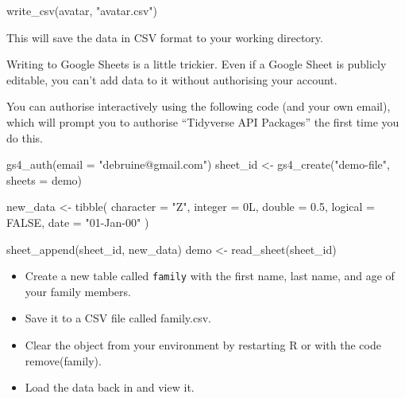 \documentclass[
  oneside]{book}
\newenvironment{Shaded}{\begin{snugshade}}{\end{snugshade}}
\newcommand{\AttributeTok}[1]{\textcolor[rgb]{0.77,0.63,0.00}{#1}}
\newcommand{\ConstantTok}[1]{\textcolor[rgb]{0.00,0.00,0.00}{#1}}
\newcommand{\FloatTok}[1]{\textcolor[rgb]{0.00,0.00,0.81}{#1}}
\newcommand{\FunctionTok}[1]{\textcolor[rgb]{0.00,0.00,0.00}{#1}}
\newcommand{\NormalTok}[1]{#1}
\newcommand{\OtherTok}[1]{\textcolor[rgb]{0.56,0.35,0.01}{#1}}
\newcommand{\StringTok}[1]{\textcolor[rgb]{0.31,0.60,0.02}{#1}}
\providecommand{\tightlist}{%
  \setlength{\itemsep}{0pt}\setlength{\parskip}{0pt}}
\begin{document}
\begin{Shaded}
\begin{Highlighting}[]
\FunctionTok{write\_csv}\NormalTok{(avatar, }\StringTok{"avatar.csv"}\NormalTok{)}
\end{Highlighting}
\end{Shaded}

This will save the data in CSV format to your working directory.

Writing to Google Sheets is a little trickier. Even if a Google Sheet is publicly editable, you can't add data to it without authorising your account.

You can authorise interactively using the following code (and your own email), which will prompt you to authorise ``Tidyverse API Packages'' the first time you do this.

\begin{Shaded}
\begin{Highlighting}[]
\FunctionTok{gs4\_auth}\NormalTok{(}\AttributeTok{email =} \StringTok{"debruine@gmail.com"}\NormalTok{)}
\NormalTok{sheet\_id }\OtherTok{\textless{}{-}} \FunctionTok{gs4\_create}\NormalTok{(}\StringTok{"demo{-}file"}\NormalTok{, }\AttributeTok{sheets =}\NormalTok{ demo)}

\NormalTok{new\_data }\OtherTok{\textless{}{-}} \FunctionTok{tibble}\NormalTok{(}
  \AttributeTok{character =} \StringTok{"Z"}\NormalTok{,}
  \AttributeTok{integer =}\NormalTok{ 0L,}
  \AttributeTok{double =} \FloatTok{0.5}\NormalTok{,}
  \AttributeTok{logical =} \ConstantTok{FALSE}\NormalTok{,}
  \AttributeTok{date =} \StringTok{"01{-}Jan{-}00"}
\NormalTok{)}

\FunctionTok{sheet\_append}\NormalTok{(sheet\_id, new\_data)}
\NormalTok{demo }\OtherTok{\textless{}{-}} \FunctionTok{read\_sheet}\NormalTok{(sheet\_id)}
\end{Highlighting}
\end{Shaded}

\begin{try}

\begin{itemize}
\tightlist
\item
  Create a new table called \texttt{family} with the first name, last name, and age of your family members.
\item
  Save it to a CSV file called family.csv.
\item
  Clear the object from your environment by restarting R or with the code {remove}{(}{family}{)}.
\item
  Load the data back in and view it.
\end{itemize}

\end{try}
\end{document}
